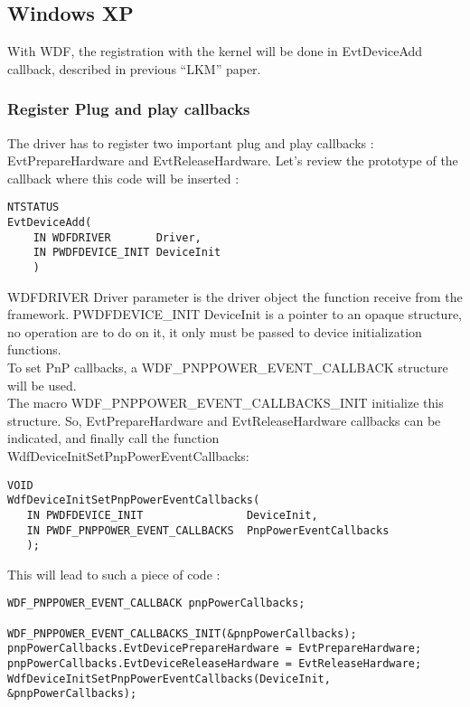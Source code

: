 \documentclass[11pt]{report}
\begin{document}
\subsection{Windows XP}
With WDF, the registration with the kernel will be done in EvtDeviceAdd callback, 
described in previous ``LKM'' paper.

    \subsubsection{Register Plug and play callbacks}
The driver has to register two important plug and play callbacks :
EvtPrepareHardware and EvtReleaseHardware.
Let's review the prototype of the callback where this code will be inserted :
\begin{lstlisting}
NTSTATUS
EvtDeviceAdd(
    IN WDFDRIVER       Driver,
    IN PWDFDEVICE_INIT DeviceInit
    )
\end{lstlisting}
WDFDRIVER Driver parameter is the driver object the function receive from the framework.
PWDFDEVICE\_INIT DeviceInit is a pointer to an opaque structure, 
no operation are to do on it, it only must be passed to
device initialization functions.\\
To set PnP callbacks, a WDF\_PNPPOWER\_EVENT\_CALLBACK structure will be used.\\
The macro WDF\_PNPPOWER\_EVENT\_CALLBACKS\_INIT initialize this structure.
So, EvtPrepareHardware and EvtReleaseHardware callbacks can be indicated, and
finally call the function WdfDeviceInitSetPnpPowerEventCallbacks:
\begin{lstlisting}
VOID
WdfDeviceInitSetPnpPowerEventCallbacks(
   IN PWDFDEVICE_INIT                DeviceInit,
   IN PWDF_PNPPOWER_EVENT_CALLBACKS  PnpPowerEventCallbacks
   );
\end{lstlisting}
This will lead to such a piece of code :
\begin{lstlisting}
WDF_PNPPOWER_EVENT_CALLBACK pnpPowerCallbacks;

WDF_PNPPOWER_EVENT_CALLBACKS_INIT(&pnpPowerCallbacks);
pnpPowerCallbacks.EvtDevicePrepareHardware = EvtPrepareHardware;
pnpPowerCallbacks.EvtDeviceReleaseHardware = EvtReleaseHardware;
WdfDeviceInitSetPnpPowerEventCallbacks(DeviceInit, &pnpPowerCallbacks);
\end{lstlisting}
\end{document}
